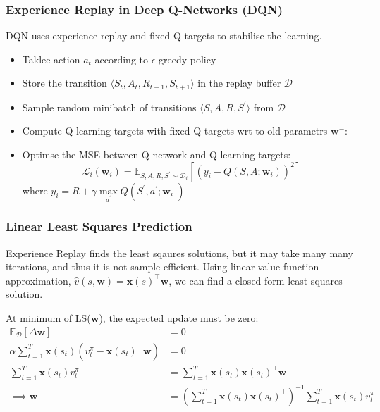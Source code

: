 \subsubsection{Experience Replay in Deep Q-Networks (DQN)}
DQN uses experience replay and fixed Q-targets to stabilise the learning.
\begin{itemize}
    \item Taklee action \(a_t\) according to \(\epsilon\)-greedy policy
    \item Store the transition \(\langle S_t,A_t,R_{t+1},S_{t+1} \rangle\) in the replay
    buffer \(\mathcal{D}\) 
    \item Sample random minibatch of transitions \(\langle S,A,R,S^{\prime} \rangle\) from \(\mathcal{D}\)
    \item Compute Q-learning targets with fixed Q-targets wrt to old parametrs \(\mathbf{w}^{-}\):
    \item Optimse the MSE between Q-network and Q-learning targets:
    \[
        \mathcal{L}_i(\mathbf{w}_i) = \mathbb{E}_{S,A,R,S^{\prime} \sim \mathcal{D}_i} \left[ 
            \left( 
                y_i - Q(S,A;\mathbf{w}_i)
             \right)^2
         \right]
    \]
    where \(y_i = R + \gamma \max\limits_{a^{\prime}} Q(S^{\prime},a^{\prime};\mathbf{w}_i^{-})\)

\end{itemize}

\subsubsection{Linear Least Squares Prediction}
Experience Replay finds the least sqaures solutions, but it may take many many iterations, and thus it is not
sample efficient. Using linear value function approximation, \(\hat{v}(s,\mathbf{w}) = \mathbf{x}(s)^{\top}
\mathbf{w}\), we can find a closed form least squares solution.

At minimum of LS(\(\mathbf{w}\)), the expected update must be zero:
\[
    \begin{aligned}
        \mathbb{E}_{\mathcal{D}} \left[ \Delta \mathbf{w} 
         \right]  &= 0 \\
         \alpha \sum_{t=1}^T \mathbf{x}(s_t)(v_t^{\pi} - \mathbf{x}(s_t)^{\top} \mathbf{w}) &= 0 \\
         \sum_{t=1}^T \mathbf{x}(s_t) v_t^{\pi} &= \sum_{t=1}^T \mathbf{x}(s_t) \mathbf{x}
         (s_t)^{\top} \mathbf{w} \\
         \implies  \mathbf{w} &= \left( \sum_{t=1}^T \mathbf{x}(s_t) \mathbf{x}(s_t)^{\top} \right)^{-1}
          \sum_{t=1}^T \mathbf{x}(s_t) v_t^{\pi}
    \end{aligned}
\]

